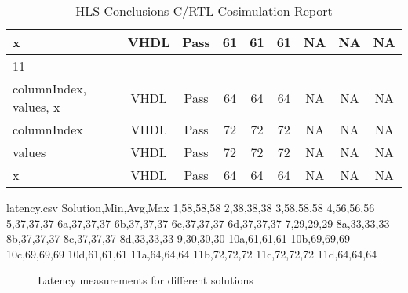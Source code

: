 \begin{table}[H]
\begin{tabular}{|l|c|c|c|c|c|c|c|c|}
		\tabitem x & VHDL & Pass & 61 & 61 & 61 & NA & NA & NA \\
		\hline
		11 &  &  &  &  &  &  &  &  \\
		\tabitem columnIndex, values, x & VHDL & Pass & 64 & 64 & 64 & NA & NA & NA \\
		\tabitem columnIndex & VHDL & Pass & 72 & 72 & 72 & NA & NA & NA \\
		\tabitem values & VHDL & Pass & 72 & 72 & 72 & NA & NA & NA \\
		\tabitem x & VHDL & Pass & 64 & 64 & 64 & NA & NA & NA \\
		\hline
	\end{tabular}
	\caption{HLS Conclusions C/RTL Cosimulation Report }
	\label{tab:hls-conclusions-cosimulation-report}
\end{table}

\begin{filecontents*}{latency.csv}
	Solution,Min,Avg,Max
	1,58,58,58
	2,38,38,38
	3,58,58,58
	4,56,56,56
	5,37,37,37
	6a,37,37,37
	6b,37,37,37
	6c,37,37,37
	6d,37,37,37
	7,29,29,29
	8a,33,33,33
	8b,37,37,37
	8c,37,37,37
	8d,33,33,33
	9,30,30,30
	10a,61,61,61
	10b,69,69,69
	10c,69,69,69
	10d,61,61,61
	11a,64,64,64
	11b,72,72,72
	11c,72,72,72
	11d,64,64,64
\end{filecontents*}

\begin{figure}
	\caption{Latency measurements for different solutions}
	\label{fig:latency-measurements}
\end{figure}





